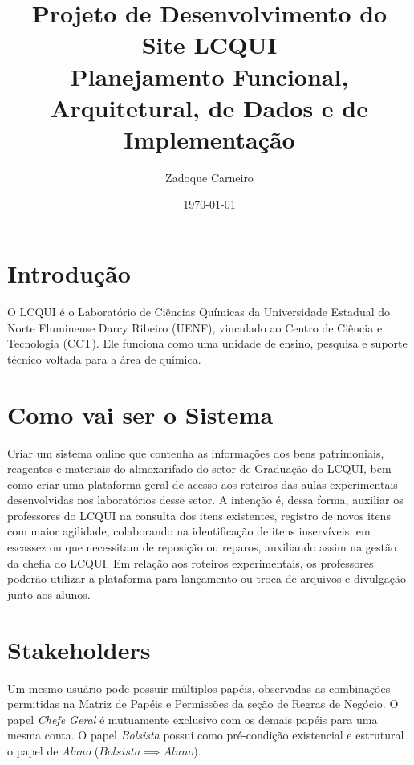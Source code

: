 \documentclass[12pt,a4paper]{article}
\title{\textbf{Projeto de Desenvolvimento do Site LCQUI}\\[0.5em]\large Planejamento Funcional, Arquitetural, de Dados e de Implementação}
\author{Zadoque Carneiro}
\date{\today}
\begin{document}
\maketitle
\tableofcontents
\newpage

\section{Introdução}

O LCQUI é o Laboratório de Ciências Químicas da Universidade Estadual do Norte Fluminense Darcy Ribeiro (UENF), vinculado ao Centro de Ciência e Tecnologia (CCT). Ele funciona como uma unidade de ensino, pesquisa e suporte técnico voltada para a área de química.

\section{Como vai ser o Sistema}

Criar um sistema online que contenha as informações dos bens patrimoniais, reagentes e materiais do almoxarifado do setor de Graduação do LCQUI, bem como criar uma plataforma geral de acesso aos roteiros das aulas experimentais desenvolvidas nos laboratórios desse setor. A intenção é, dessa forma, auxiliar os professores do LCQUI na consulta dos itens existentes, registro de novos itens com maior agilidade, colaborando na identificação de itens inservíveis, em escassez ou que necessitam de reposição ou reparos, auxiliando assim na gestão da chefia do LCQUI. Em relação aos roteiros experimentais, os professores poderão utilizar a plataforma para lançamento ou troca de arquivos e divulgação junto aos alunos.


\section{Stakeholders}

\begin{explicacao}[Importante]
Um mesmo usuário pode possuir múltiplos papéis, observadas as combinações permitidas na Matriz de Papéis e Permissões da seção de Regras de Negócio. O papel \textit{Chefe Geral} é mutuamente exclusivo com os demais papéis para uma mesma conta. O papel \textit{Bolsista} possui como pré-condição existencial e estrutural o papel de \textit{Aluno} ($Bolsista \implies Aluno$).
\end{explicacao}
\end{document}
